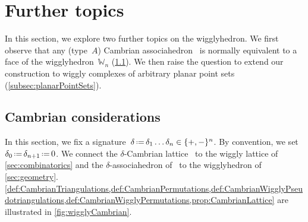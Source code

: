 \documentclass{amsart}
\theoremstyle{definition}
\newcommand{\eqdef}{\mbox{\,\raisebox{0.2ex}{\scriptsize\ensuremath{\mathrm:}}\ensuremath{=}\,}} %
\newcommand{\polytope}[1]{\mathds{#1}} %
\newcommand{\wigglyhedron}{\polytope{W}} %
\begin{document}

\section{Further topics}
\label{sec:furtherTopics}

In this section, we explore two further topics on the wigglyhedron.
We first observe that any (type~$A$) Cambrian associahedron~\cite{Reading-CambrianLattices,HohlwegLange} is normally equivalent to a face of the wigglyhedron~$\wigglyhedron_n$ (\cref{subsec:CambrianConsiderations}).
We then raise the question to extend our construction to wiggly complexes of arbitrary planar point sets (\cref{subsec:planarPointSets}).


\subsection{Cambrian considerations}
\label{subsec:CambrianConsiderations}

In this section, we fix a signature~$\delta \eqdef \delta_1 \dots \delta_n \in \{+,-\}^n$. By convention, we set~$\delta_0 \eqdef \delta_{n+1} \eqdef 0$.
We connect the $\delta$-Cambrian lattice~\cite{Reading-CambrianLattices} to the wiggly lattice of \cref{sec:combinatorics} and the $\delta$-associahedron of~\cite{HohlwegLange} to the wigglyhedron of \cref{sec:geometry}.
\cref{def:CambrianTriangulations,def:CambrianPermutations,def:CambrianWigglyPseudotriangulations,def:CambrianWigglyPermutations,prop:CambrianLattice} are illustrated in \cref{fig:wigglyCambrian}.
\end{document}
